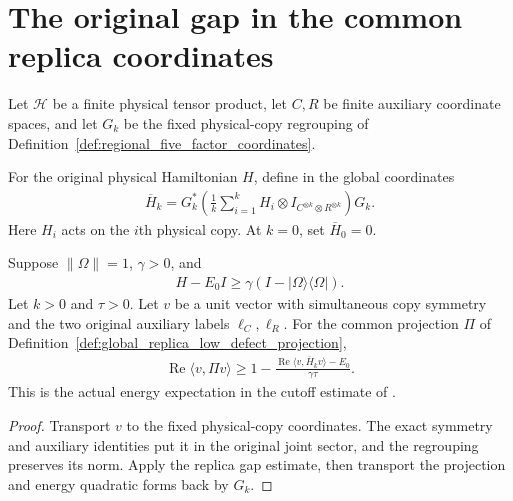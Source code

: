 \section{The original gap in the common replica coordinates}
\label{sec:regional_low_defect_mass}

Let $\mathcal H$ be a finite physical tensor product, let $C,R$ be finite
auxiliary coordinate spaces, and let $G_k$ be the fixed physical-copy
regrouping of Definition~\ref{def:regional_five_factor_coordinates}.

\begin{definition}
\label{def:global_replica_mean_hamiltonian}
\leanok
For the original physical Hamiltonian $H$, define in the global coordinates
\begin{align}
 \overline H_k
 =G_k^*\left(\frac1k\sum_{i=1}^k H_i\otimes I_{C^{\otimes k}\otimes R^{\otimes k}}\right)G_k.
\end{align}
Here $H_i$ acts on the $i$th physical copy. At $k=0$, set
$\overline H_0=0$.
\end{definition}

\begin{theorem}
\label{thm:global_low_defect_gap_mass}
\leanok
Suppose $\|\Omega\|=1$, $\gamma>0$, and
\begin{align}
 H-E_0I\geq\gamma(I-|\Omega\rangle\langle\Omega|).
\end{align}
Let $k>0$ and $\tau>0$. Let $v$ be a unit vector with simultaneous
copy symmetry and the two original auxiliary labels $\ell_C,\ell_R$.
For the common projection $\Pi$ of
Definition~\ref{def:global_replica_low_defect_projection},
\begin{align}
 \operatorname{Re}\langle v,\Pi v\rangle
 \geq 1-\frac{\operatorname{Re}\langle v,\overline H_kv\rangle-E_0}{\gamma\tau}.
\end{align}
This is the actual energy expectation in the cutoff estimate of
\cite[Section~8, lines~421--443]{OpenAI2026AreaLaw}.
\end{theorem}
\begin{proof}
\leanok
{}
Transport $v$ to the fixed physical-copy coordinates. The exact symmetry
and auxiliary identities put it in the original joint sector, and the
regrouping preserves its norm. Apply the replica gap estimate, then
transport the projection and energy quadratic forms back by $G_k$.
\end{proof}
